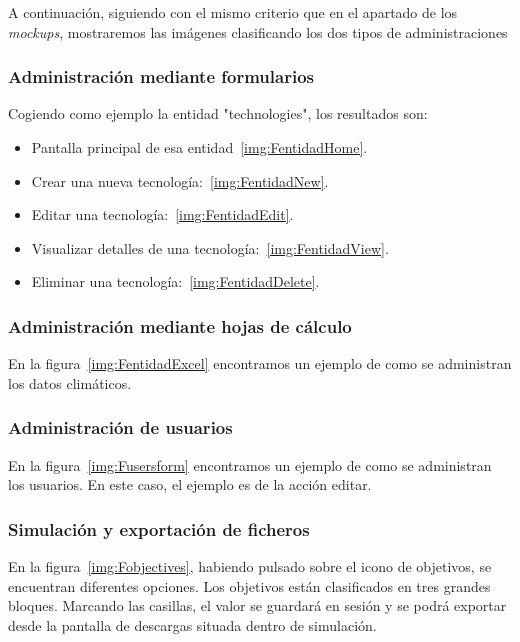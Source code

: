 A continuación, siguiendo con el mismo criterio que en el apartado de los \textit{mockups}, mostraremos las imágenes clasificando los dos tipos de administraciones

\subsubsection{Administración mediante formularios} 

Cogiendo como ejemplo la entidad "technologies", los resultados son: 

\begin{itemize}
	\item Pantalla principal de esa entidad~\ref{img:FentidadHome}.
	\item Crear una nueva tecnología:~\ref{img:FentidadNew}.
	\item Editar una tecnología:~\ref{img:FentidadEdit}.
	\item Visualizar detalles de una tecnología:~\ref{img:FentidadView}.
	\item Eliminar una tecnología:~\ref{img:FentidadDelete}.
\end{itemize}

\subsubsection{Administración mediante hojas de cálculo} 

En la figura~\ref{img:FentidadExcel} encontramos un ejemplo de como se administran los datos climáticos. 

\subsubsection{Administración de usuarios} 

En la figura~\ref{img:Fusersform} encontramos un ejemplo de como se administran los usuarios. En este caso, el ejemplo es de la acción editar. 

\subsubsection{Simulación y exportación de ficheros} 

En la figura~\ref{img:Fobjectives}, habiendo pulsado sobre el icono de objetivos, se encuentran diferentes opciones. Los objetivos están clasificados en tres grandes bloques. Marcando las casillas, el valor se guardará en sesión y se podrá exportar desde la pantalla de descargas situada dentro de simulación.

